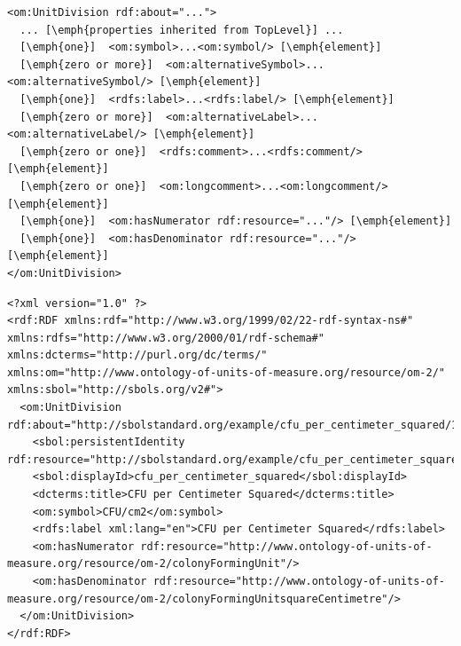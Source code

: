\begin{lstlisting}
<om:UnitDivision rdf:about="...">
  ... [\emph{properties inherited from TopLevel}] ...
  [\emph{one}]  <om:symbol>...<om:symbol/> [\emph{element}]
  [\emph{zero or more}]  <om:alternativeSymbol>...<om:alternativeSymbol/> [\emph{element}]
  [\emph{one}]  <rdfs:label>...<rdfs:label/> [\emph{element}]
  [\emph{zero or more}]  <om:alternativeLabel>...<om:alternativeLabel/> [\emph{element}]
  [\emph{zero or one}]  <rdfs:comment>...<rdfs:comment/> [\emph{element}]
  [\emph{zero or one}]  <om:longcomment>...<om:longcomment/> [\emph{element}]
  [\emph{one}]  <om:hasNumerator rdf:resource="..."/> [\emph{element}]
  [\emph{one}]  <om:hasDenominator rdf:resource="..."/> [\emph{element}]
</om:UnitDivision>
\end{lstlisting}

\begin{lstlisting}
<?xml version="1.0" ?>
<rdf:RDF xmlns:rdf="http://www.w3.org/1999/02/22-rdf-syntax-ns#" xmlns:rdfs="http://www.w3.org/2000/01/rdf-schema#" xmlns:dcterms="http://purl.org/dc/terms/" xmlns:om="http://www.ontology-of-units-of-measure.org/resource/om-2/" xmlns:sbol="http://sbols.org/v2#">
  <om:UnitDivision rdf:about="http://sbolstandard.org/example/cfu_per_centimeter_squared/1">
    <sbol:persistentIdentity rdf:resource="http://sbolstandard.org/example/cfu_per_centimeter_squared"/>
    <sbol:displayId>cfu_per_centimeter_squared</sbol:displayId>
    <dcterms:title>CFU per Centimeter Squared</dcterms:title>
    <om:symbol>CFU/cm2</om:symbol>
    <rdfs:label xml:lang="en">CFU per Centimeter Squared</rdfs:label>
    <om:hasNumerator rdf:resource="http://www.ontology-of-units-of-measure.org/resource/om-2/colonyFormingUnit"/>
    <om:hasDenominator rdf:resource="http://www.ontology-of-units-of-measure.org/resource/om-2/colonyFormingUnitsquareCentimetre"/>
  </om:UnitDivision>
</rdf:RDF>
\end{lstlisting}
\label{ser:UnitDivision}


